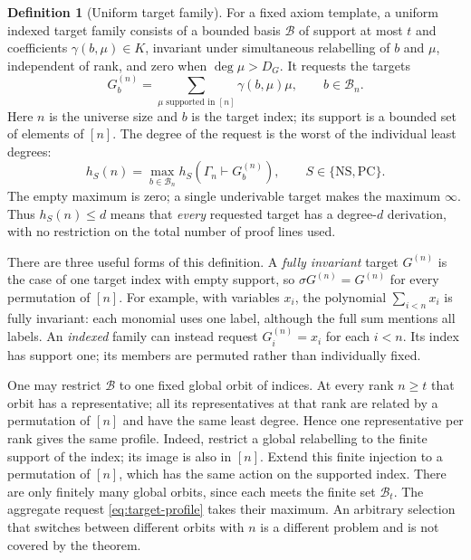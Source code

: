 \documentclass[11pt,a4paper]{article}
\theoremstyle{definition}\newtheorem{definition}[theorem]{Definition}
\theoremstyle{remark}\newtheorem{remark}[theorem]{Remark}
\newcommand{\NS}{\mathrm{NS}}\newcommand{\PC}{\mathrm{PC}}
\begin{document}
\begin{definition}[Uniform target family]\label{def:uniform-target}
For a fixed axiom template, a uniform indexed target family consists of
a bounded basis $\mathcal B$ of support at most $t$ and coefficients
$\gamma(b,\mu)\in K$, invariant under simultaneous relabelling of
$b$ and $\mu$, independent of rank, and zero when $\deg\mu>D_G$.
It requests the targets
\[
 G_b^{(n)}=\sum_{\mu\text{ supported in }[n]}\gamma(b,\mu)\mu,
                         \qquad b\in\mathcal B_n.
\]
Here $n$ is the universe size and $b$ is the target index; its support
is a bounded set of elements of $[n]$.
The degree of the request is the worst of the individual least degrees:
\begin{equation}\label{eq:target-profile}
 h_S(n)=\max_{b\in\mathcal B_n}h_S(\Gamma_n\vdash G_b^{(n)}),
                         \qquad S\in\{\NS,\PC\}.
\end{equation}
The empty maximum is zero; a single underivable target makes the
maximum $\infty$. Thus $h_S(n)\le d$ means that \emph{every} requested
target has a degree-$d$ derivation, with no restriction on the total
number of proof lines used.
\end{definition}

There are three useful forms of this definition. A \emph{fully invariant}
target $G^{(n)}$ is the case of one target index with empty support, so
$\sigma G^{(n)}=G^{(n)}$ for every permutation of $[n]$. For example, with
variables $x_i$, the polynomial $\sum_{i<n}x_i$ is fully invariant:
each monomial uses one label, although the full sum mentions all labels.
An \emph{indexed} family can instead request $G_i^{(n)}=x_i$ for each
$i<n$. Its index has support one; its members are permuted rather than
individually fixed.

One may restrict $\mathcal B$ to one fixed global orbit of indices.
At every rank $n\ge t$ that orbit has a representative; all its
representatives at that rank are related by a permutation of $[n]$ and
have the same least degree. Hence one representative per rank gives the
same profile. Indeed, restrict a global relabelling to the finite support of the index; its image is also in $[n]$. Extend this finite injection to a permutation of $[n]$, which has the same action on the supported index. There are only finitely many global orbits, since each
meets the finite set $\mathcal B_t$. The aggregate request
\eqref{eq:target-profile} takes their maximum. An arbitrary selection
that switches between different orbits with $n$ is a different problem
and is not covered by the theorem.
\end{document}
